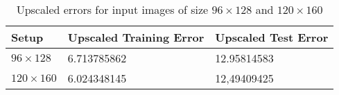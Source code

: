 \begin{table}[h!]
\centering
\footnotesize
\begin{tabular}{|l|l|l|}
	\hline
		\textbf{Setup} & \textbf{Upscaled Training Error} & \textbf{Upscaled Test Error}\\
	\hline
		$96\times128$	& 6.713785862
						& 12.95814583
						\\
	\hline
		$120\times160$ 	& 6.024348145
						& 12,49409425
						\\
	\hline
	\end{tabular}
	\normalsize
	\caption{Upscaled errors for input images of size $96\times128$ and $120\times160$}
	\label{tab:gabor_errors_480_96_vs_120}
\end{table}

